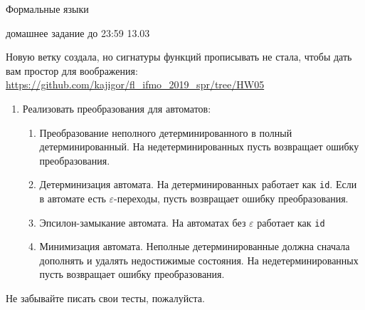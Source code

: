 \documentclass{article}
\begin{document}
\begin{center} {\LARGE Формальные языки} \end{center}

\begin{center} {домашнее задание до 23:59 13.03} \end{center}
\bigskip

Новую ветку создала, но сигнатуры функций прописывать не стала, чтобы дать вам простор для воображения: \href{https://github.com/kajigor/fl_ifmo_2019_spr/tree/HW05}{https://github.com/kajigor/fl\_ifmo\_2019\_spr/tree/HW05}

\begin{enumerate}
  \item
  {
    Реализовать преобразования для автоматов: 
    
    \begin{enumerate} 
      \item Преобразование неполного детерминированного в полный детерминированный. На недетерминированных пусть возвращает ошибку преобразования.
      \item Детерминизация автомата. На детерминированных работает как \verb!id!. Если в автомате есть $\varepsilon$-переходы, пусть возвращает ошибку преобразования.
      \item Эпсилон-замыкание автомата. На автоматах без $\varepsilon$ работает как \verb!id!
      \item Минимизация автомата. Неполные детерминированные должна сначала дополнять и удалять недостижимые состояния. На недетерминированных пусть возвращает ошибку преобразования.
    \end{enumerate}
  }
\end{enumerate}


    Не забывайте писать свои тесты, пожалуйста. 
\end{document}

